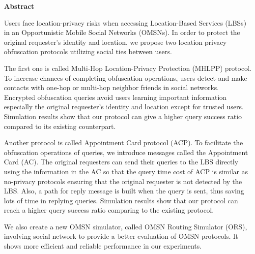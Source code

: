 
\begin{center}\textbf{Abstract}\end{center}

\noindent Users face location-privacy risks when accessing Location-Based Services (LBSs) in an Opportunistic Mobile Social Networks (OMSNs). In order to protect the original requester's identity and location, we propose two location privacy obfuscation protocols utilizing social ties between users.

The first one is called Multi-Hop Location-Privacy Protection (MHLPP) protocol. To increase chances of completing obfuscation operations, users detect and make contacts with one-hop or multi-hop neighbor friends in social networks. Encrypted obfuscation queries avoid users learning important information especially the original requester's identity and location except for trusted users. Simulation results show that our protocol can give a higher query success ratio compared to its existing counterpart. 

Another protocol is called Appointment Card protocol (ACP). To facilitate the obfuscation operations of queries, we introduce messages called the Appointment Card (AC). The original requesters can send their queries to the LBS directly using the information in the AC so that the query time cost of ACP is similar as no-privacy protocols ensuring that the original requester is not detected by the LBS. Also, a path for reply message is built when the query is sent, thus saving lots of time in replying queries. Simulation results show that our protocol can reach a higher query success ratio comparing to the existing protocol.

We also create a new OMSN simulator, called OMSN Routing Simulator (ORS), involving social network to provide a better evaluation of OMSN protocols. It shows more efficient and reliable performance in our experiments.


\cleardoublepage
